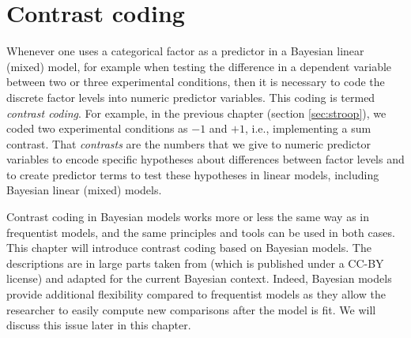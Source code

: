 \documentclass[12pt,]{krantz}
\theoremstyle{definition}
\theoremstyle{definition}
\theoremstyle{definition}
\theoremstyle{remark}
\begin{document}
\hypertarget{ch:contr}{%
\chapter{Contrast coding}\label{ch:contr}}

Whenever one uses a categorical factor as a predictor in a Bayesian linear (mixed) model, for example when testing the difference in a dependent variable between two or three experimental conditions, then it is necessary to code the discrete factor levels into numeric predictor variables. This coding is termed \emph{contrast coding}. For example, in the previous chapter (section \ref{sec:stroop}), we coded two experimental conditions as \(-1\) and \(+1\), i.e., implementing a sum contrast. That \emph{contrasts} are the numbers that we give to numeric predictor variables to encode specific hypotheses about differences between factor levels and to create predictor terms to test these hypotheses in linear models, including Bayesian linear (mixed) models.

Contrast coding in Bayesian models works more or less the same way as in frequentist models, and the same principles and tools can be used in both cases. This chapter will introduce contrast coding based on Bayesian models. The descriptions are in large parts taken from \citet{schad2020capitalize} (which is published under a CC-BY license) and adapted for the current Bayesian context. Indeed, Bayesian models provide additional flexibility compared to frequentist models as they allow the researcher to easily compute new comparisons after the model is fit. We will discuss this issue later in this chapter.
\end{document}
